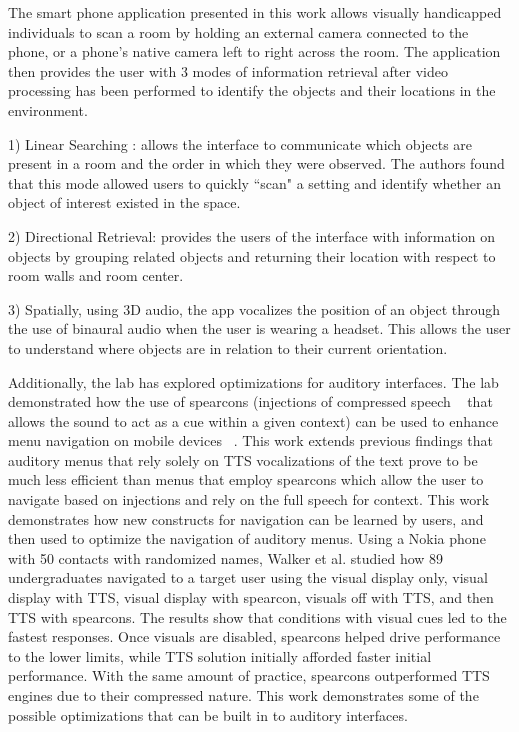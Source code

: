 The smart phone application presented in this work allows visually handicapped
individuals to scan a room by holding an external camera connected to the phone,
or a phone's native camera left to right across the room. The application then
provides the user with 3 modes of information retrieval after video processing
has been performed to identify the objects and their locations in the environment.

1) Linear Searching : allows the interface to communicate which objects are
present in a room and the order in which they were observed.  The authors found
that this mode allowed users to quickly ``scan" a setting and identify whether an
object of interest existed in the space.

2) Directional Retrieval: provides the users of the interface with information
on objects by grouping related objects and returning their location with respect
to room walls and room center.

3) Spatially, using 3D audio, the app vocalizes the position of an object through
the use of binaural audio when the user is wearing a headset. This allows the user
to understand where objects are in relation to their current orientation.

Additionally, the lab has explored optimizations for auditory interfaces. The
lab demonstrated how the use of spearcons (injections of compressed speech ~\cite{
jeon2009enhanced} that allows the sound to act as a cue within a given context)
can be used to enhance menu navigation on mobile devices ~\cite{
walker2009spearcon}. This work extends previous findings that auditory menus
that rely solely on TTS vocalizations of the text prove to be much less efficient
than menus that employ spearcons which allow the user to navigate based on injections
and rely on the full speech for context.  This work demonstrates how new constructs
for navigation can be learned by users, and then used to optimize the navigation
of auditory menus.  Using a Nokia phone with 50 contacts with randomized names,
Walker et al. studied how 89 undergraduates navigated to a target user using
the visual display only, visual display with TTS, visual display with spearcon,
visuals off with TTS, and then TTS with spearcons. The results show that conditions
with visual cues led to the fastest responses.  Once visuals are disabled, spearcons
helped drive performance to the lower limits, while TTS solution initially afforded
faster initial performance.  With the same amount of practice, spearcons outperformed
TTS engines due to their compressed nature.  This work demonstrates some of the
possible optimizations that can be built in to auditory interfaces.

